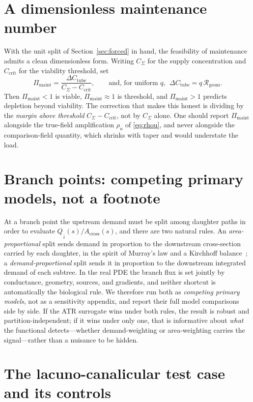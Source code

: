 \documentclass[11pt]{article}
\theoremstyle{remark}
\newcommand{\Sig}{\Sigma}
\newcommand{\Acr}{A_{\mathrm{cross}}}
\newcommand{\Rgeom}{\mathcal{R}_{\mathrm{geom}}}
\newcommand{\dCtube}{\Delta C_{\mathrm{tube}}}
\newcommand{\Qdn}{Q_{\downarrow}}
\newcommand{\rhou}{\rho_u}
\newcommand{\Pimaint}{\Pi_{\mathrm{maint}}}
\begin{document}
\section{A dimensionless maintenance number}\label{sec:pimaint}

With the unit split of Section~\ref{sec:forced} in hand, the feasibility of
maintenance admits a clean dimensionless form. Writing $C_\Sig$ for the supply
concentration and $C_{\text{crit}}$ for the viability threshold, set
\begin{equation}\label{eq:pimaint}
\Pimaint=\frac{\dCtube}{C_\Sig-C_{\text{crit}}},\qquad\text{and, for uniform }q,\ \
\dCtube=q\,\Rgeom .
\end{equation}
Then $\Pimaint<1$ is viable, $\Pimaint\approx1$ is threshold, and $\Pimaint>1$
predicts depletion beyond viability. The correction that makes this honest is
dividing by the \emph{margin above threshold} $C_\Sig-C_{\text{crit}}$, not by
$C_\Sig$ alone. One should report $\Pimaint$ alongside the true-field
amplification $\rhou$ of \eqref{eq:rhou}, and never alongside the comparison-field
quantity, which shrinks with taper and would understate the load.

\section{Branch points: competing primary models, not a footnote}\label{sec:branch}

At a branch point the upstream demand must be split among daughter paths in order
to evaluate $\Qdn(s)/\Acr(s)$, and there are two natural rules. An
\emph{area-proportional} split sends demand in proportion to the downstream
cross-section carried by each daughter, in the spirit of Murray's law and a
Kirchhoff balance~\cite{murray1926}; a \emph{demand-proportional} split sends it
in proportion to the downstream integrated demand of each subtree. In the real
PDE the branch flux is set jointly by conductance, geometry, sources, and
gradients, and neither shortcut is automatically the biological rule. We therefore
run both as \emph{competing primary models}, not as a sensitivity appendix, and
report their full model comparisons side by side. If the ATR surrogate wins under
both rules, the result is robust and partition-independent; if it wins under only
one, that is informative about \emph{what} the functional detects---whether
demand-weighting or area-weighting carries the signal---rather than a nuisance to
be hidden.

\section{The lacuno-canalicular test case and its controls}\label{sec:lcn}
\end{document}

